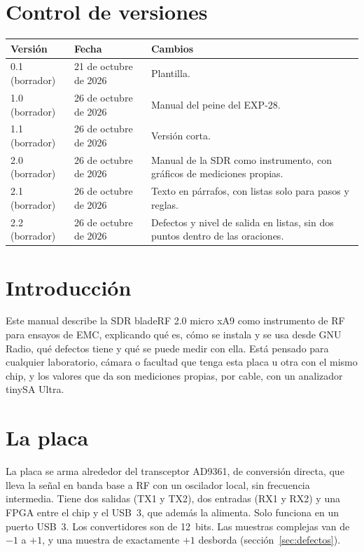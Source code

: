 \documentclass[11pt,a4paper]{article}
\newcommand{\fecha}{26 de octubre de 2026}
\begin{document}
\section*{Control de versiones}
\begin{tabular}{@{}llp{8cm}@{}}
  \toprule
  Versión & Fecha & Cambios \\
  \midrule
  0.1 (borrador) & 21 de octubre de 2026 & Plantilla. \\
  1.0 (borrador) & 26 de octubre de 2026 & Manual del peine del EXP-28. \\
  1.1 (borrador) & 26 de octubre de 2026 & Versión corta. \\
  2.0 (borrador) & 26 de octubre de 2026 & Manual de la SDR como instrumento, con gráficos de mediciones propias. \\
  2.1 (borrador) & 26 de octubre de 2026 & Texto en párrafos, con listas solo para pasos y reglas. \\
  2.2 (borrador) & \fecha & Defectos y nivel de salida en listas, sin dos puntos dentro de las oraciones. \\
  \bottomrule
\end{tabular}

\tableofcontents

\section{Introducción}

Este manual describe la SDR bladeRF 2.0 micro xA9 como instrumento de RF para ensayos de EMC, explicando qué es, cómo se instala y se usa desde GNU Radio, qué defectos tiene y qué se puede medir con ella. Está pensado para cualquier laboratorio, cámara o facultad que tenga esta placa u otra con el mismo chip, y los valores que da son mediciones propias, por cable, con un analizador tinySA Ultra.

\section{La placa}

La placa se arma alrededor del transceptor AD9361, de conversión directa, que lleva la señal en banda base a RF con un oscilador local, sin frecuencia intermedia. Tiene dos salidas (TX1 y TX2), dos entradas (RX1 y RX2) y una FPGA entre el chip y el USB~3, que además la alimenta. Solo funciona en un puerto USB~3. Los convertidores son de 12~bits. Las muestras complejas van de $-1$ a $+1$, y una muestra de exactamente $+1$ desborda (sección~\ref{sec:defectos}).
\end{document}
